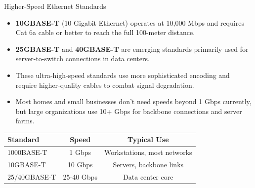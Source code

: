 \documentclass[aspectratio=169]{beamer}
\begin{document}
\begin{frame}{Higher-Speed Ethernet Standards}
    \begin{itemize}
        \item \textbf{10GBASE-T} (10 Gigabit Ethernet) operates at 10,000 Mbps and requires Cat 6a cable or better to reach the full 100-meter distance.
        \item \textbf{25GBASE-T} and \textbf{40GBASE-T} are emerging standards primarily used for server-to-switch connections in data centers.
        \item These ultra-high-speed standards use more sophisticated encoding and require higher-quality cables to combat signal degradation.
        \item Most homes and small businesses don't need speeds beyond 1 Gbps currently, but large organizations use 10+ Gbps for backbone connections and server farms.
    \end{itemize}
    
    \vspace{0.3cm}
    \begin{table}
        \centering
        \small
        \begin{tabular}{|l|c|c|}
            \hline
            \rowcolor{networkorange!20}
            \textbf{Standard} & \textbf{Speed} & \textbf{Typical Use} \\
            \hline
            1000BASE-T & 1 Gbps & Workstations, most networks \\
            \hline
            10GBASE-T & 10 Gbps & Servers, backbone links \\
            \hline
            25/40GBASE-T & 25-40 Gbps & Data center core \\
            \hline
        \end{tabular}
    \end{table}
\end{frame}
\end{document}
